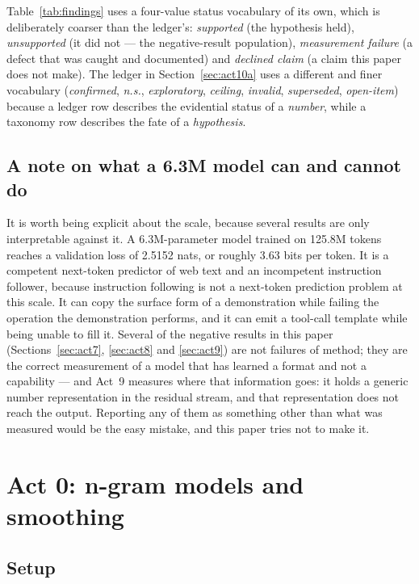 \documentclass[11pt,a4paper]{article}
\begin{document}
Table~\ref{tab:findings} uses a four-value status vocabulary of its own, which
is deliberately coarser than the ledger's: \emph{supported} (the hypothesis
held), \emph{unsupported} (it did not --- the negative-result population),
\emph{measurement failure} (a defect that was caught and documented) and
\emph{declined claim} (a claim this paper does not make). The ledger in
Section~\ref{sec:act10a} uses a different and finer vocabulary
(\emph{confirmed}, \emph{n.s.}, \emph{exploratory}, \emph{ceiling},
\emph{invalid}, \emph{superseded}, \emph{open-item}) because a ledger row
describes the evidential status of a \emph{number}, while a taxonomy row
describes the fate of a \emph{hypothesis}.

\subsection{A note on what a 6.3M model can and cannot do}
\label{sec:method-scale}

It is worth being explicit about the scale, because several results are only
interpretable against it. A 6.3M-parameter model trained on 125.8M tokens
reaches a validation loss of 2.5152 nats, or roughly 3.63 bits per token. It
is a competent next-token predictor of web text and an incompetent instruction
follower, because instruction following is not a next-token prediction problem
at this scale. It can copy the surface form of a demonstration while failing
the operation the demonstration performs, and it can emit a tool-call template
while being unable to fill it. Several of the negative results in this paper
(Sections~\ref{sec:act7}, \ref{sec:act8} and \ref{sec:act9}) are not failures
of method; they are the correct measurement of a model that has learned a
format and not a capability --- and Act~9 measures where that information goes:
it holds a generic number representation in the residual stream, and that
representation does not reach the output. Reporting any of them as something
other than what was measured would be the easy mistake, and this paper tries
not to make it.

\section{Act 0: n-gram models and smoothing}
\label{sec:act0}

\subsection{Setup}
\label{sec:act0-setup}
\end{document}

